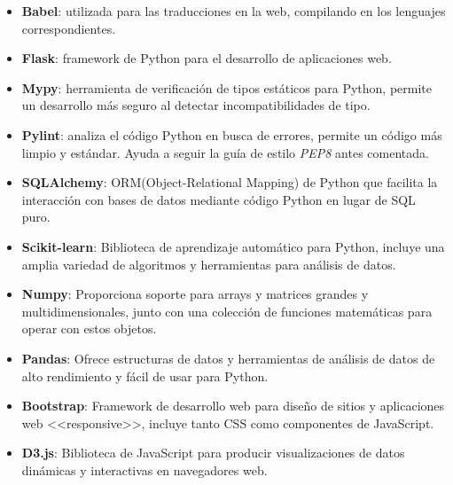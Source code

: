 \begin{itemize}
	\item \textbf{Babel}: utilizada para las traducciones en la web, compilando en los lenguajes correspondientes.
	\item \textbf{Flask}: framework de Python para el desarrollo de aplicaciones web.
	\item \textbf{Mypy}: herramienta de verificación de tipos estáticos para Python, permite un desarrollo más seguro al detectar incompatibilidades de tipo.
	\item \textbf{Pylint}: analiza el código Python en busca de errores, permite un código más limpio y estándar. Ayuda a seguir la guía de estilo \textit{PEP8} antes comentada.
	\item \textbf{SQLAlchemy}: ORM(Object-Relational Mapping) de Python que facilita la interacción con bases de datos mediante código Python en lugar de SQL puro.
	\item \textbf{Scikit-learn}: Biblioteca de aprendizaje automático para Python, incluye una amplia variedad de algoritmos y herramientas para análisis de datos.
	\item \textbf{Numpy}: Proporciona soporte para arrays y matrices grandes y multidimensionales, junto con una colección de funciones matemáticas para operar con estos objetos.
	\item \textbf{Pandas}: Ofrece estructuras de datos y herramientas de análisis de datos de alto rendimiento y fácil de usar para Python.
	\item \textbf{Bootstrap}: Framework de desarrollo web para diseño de sitios y aplicaciones web \textless\textless responsive\textgreater\textgreater, incluye tanto CSS como componentes de JavaScript.
	\item \textbf{D3.js}: Biblioteca de JavaScript para producir visualizaciones de datos dinámicas y interactivas en navegadores web.
\end{itemize}

